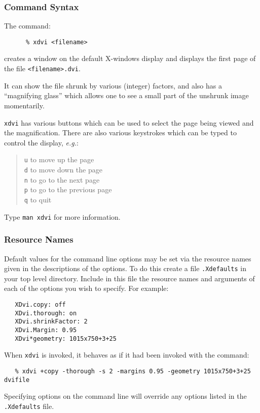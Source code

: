 \documentclass[11pt,twoside]{article}
\begin{document}
\subsubsection{Command Syntax}
The command:
\begin{verbatim}
      % xdvi <filename>
\end{verbatim}
creates a window on the default X-windows display and displays the first 
page of the file \texttt{<filename>.dvi}.

It can show the file shrunk by various
(integer) factors, and also has a ``magnifying glass'' which allows one
to see a small part of the unshrunk image momentarily.

\texttt{xdvi} has various buttons which can be used to select the page 
being viewed and the magnification. There are also various 
keystrokes which can be typed to control the display, \emph{e.g.}: 
\begin{quote}
  \texttt{u} to move up the page \\
  \texttt{d} to move down the page \\
  \texttt{n} to go to the next page \\
  \texttt{p} to go to the previous page \\ 
  \texttt{q} to quit
\end{quote}

Type \texttt{man xdvi} for more information.

\subsubsection{Resource Names}

Default values for the command line options may be set via the resource names 
given in the descriptions of the options. To do this
create a file \texttt{.Xdefaults} in your top level directory.
Include in this file the resource names
and arguments of each of the options you wish to specify.  For example:
\begin{verbatim}
   XDvi.copy: off
   XDvi.thorough: on
   XDvi.shrinkFactor: 2
   XDvi.Margin: 0.95
   XDvi*geometry: 1015x750+3+25
\end{verbatim}
   When \verb+xdvi+ is invoked, it behaves as if it had been invoked with the
   command:
\begin{verbatim}
   % xdvi +copy -thorough -s 2 -margins 0.95 -geometry 1015x750+3+25 dvifile
\end{verbatim}
   Specifying options on the command line will override any options listed
   in the \texttt{.Xdefaults} file.
\end{document}
